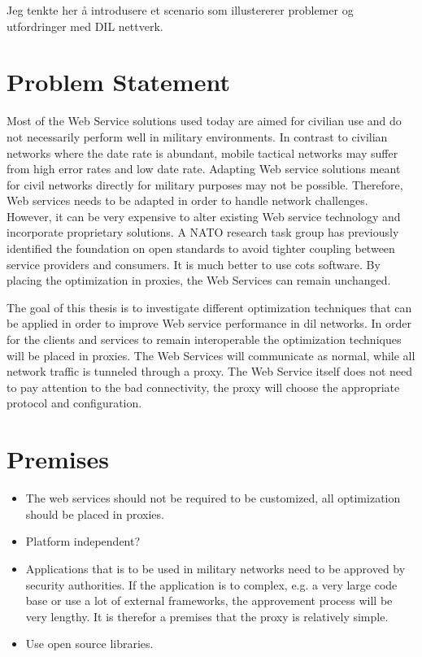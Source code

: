 Jeg tenkte her å introdusere et scenario som illustererer problemer og utfordringer
med DIL nettverk.

\section{Problem Statement}
Most of the Web Service solutions used today are aimed for civilian use and do
not necessarily perform well in military environments. In contrast to civilian
networks where the date rate is abundant, mobile tactical networks may suffer
from high error rates and low date rate. Adapting Web service solutions meant
for civil networks directly for military purposes may not be possible.
Therefore, Web services needs to be adapted in order to handle network
challenges. However, it can be very expensive to alter existing Web service
technology and incorporate proprietary solutions. A NATO research task group has
previously identified the foundation on open standards to avoid tighter coupling
between service providers and consumers\cite{ist-090}. It is much better to use
\gls{cots} software. By placing the optimization in proxies, the
Web Services can remain unchanged.

The goal of this thesis is to investigate different optimization techniques that
can be applied in order to improve Web service performance in \gls{dil}
networks. In order for the clients and services to remain interoperable the
optimization techniques will be placed in proxies. The Web Services will
communicate as normal, while all network traffic is tunneled through a proxy.
The Web Service itself does not need to pay attention to the bad connectivity,
the proxy will choose the appropriate protocol and configuration.

\section{Premises}
\begin{itemize}

\item The web services should not be required to be customized, all
optimization should be placed in proxies.
\item Platform independent?
\item Applications that is to be used in military networks need to be approved by security authorities. If the application is to complex, e.g.  a very large code base or use a lot of external frameworks, the approvement process will be very lengthy. It is therefor a premises that the proxy is relatively simple. 
\item Use open source libraries.

\end{itemize}

